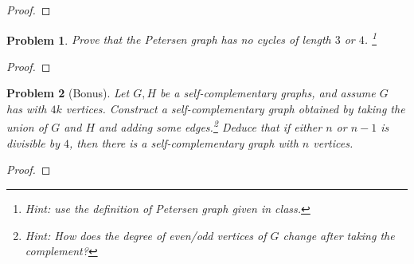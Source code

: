 \documentclass[11pt]{article}
\newtheorem{problem}{Problem}
\begin{document}
\begin{proof}

\end{proof}


\begin{problem}Prove that the Petersen graph has no cycles of length $3$ or $4$. \footnote{Hint: use the definition of Petersen graph given in class.} 
\end{problem}

\begin{proof}

\end{proof}

\begin{problem}[Bonus]
Let $G,H$ be a self-complementary graphs, and assume $G$ has with $4k$ vertices. Construct a self-complementary graph obtained by taking the union of $G$ and $H$ and adding some edges.\footnote{Hint: How does the degree of even/odd vertices of $G$ change after taking the complement?} Deduce that if either $n$ or $n-1$ is divisible by $4$, then there is a self-complementary graph with $n$ vertices. 
\end{problem}

\begin{proof}

\end{proof}
\end{document}
